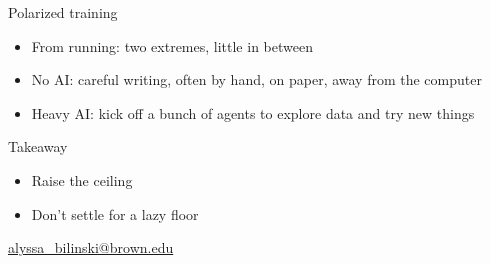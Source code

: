 \documentclass[11pt]{beamer}
\begin{document}
\begin{frame}{Polarized training}
\pause
\begin{itemize}\setlength\itemsep{10pt}
\item From running: two extremes, little in between \pause
\item No AI: careful writing, often by hand, on paper, away from the computer \pause
\item Heavy AI: kick off a bunch of agents to explore data and try new things
\end{itemize}
\end{frame}


\begin{frame}{Takeaway}
\vfill
\pause
\begin{itemize}\setlength\itemsep{12pt}
\item Raise the ceiling \pause
\item Don't settle for a lazy floor
\end{itemize}
\vfill
\pause
\centering
\href{mailto:alyssa_bilinski@brown.edu}{alyssa\_bilinski@brown.edu}
\vfill
\end{frame}
\end{document}

